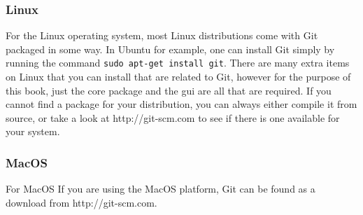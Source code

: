\subsubsection{Linux}
For the Linux operating system, most Linux distributions come with Git packaged in some way.
In Ubuntu for example, one can install Git simply by running the command \texttt{sudo apt-get install git}.
There are many extra items on Linux that you can install that are related to Git, however for the purpose of this book, just the core package and the gui are all that are required.
If you cannot find a package for your distribution, you can always either compile it from source, or take a look at http://git-scm.com to see if there is one available for your system.

\subsubsection{MacOS}
For MacOS
If you are using the MacOS platform, Git can be found as a download from http://git-scm.com.
